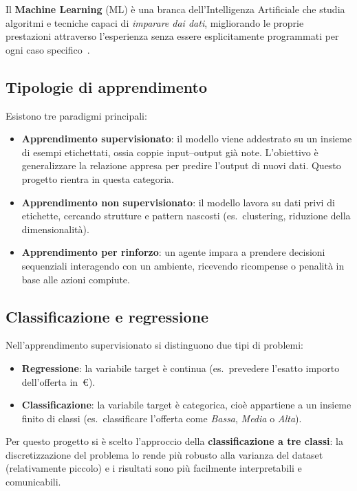 \documentclass[12pt, a4paper]{article}
\begin{document}
Il \textbf{Machine Learning} (ML) è una branca dell'Intelligenza Artificiale
che studia algoritmi e tecniche capaci di \emph{imparare dai dati}, migliorando
le proprie prestazioni attraverso l'esperienza senza essere esplicitamente
programmati per ogni caso specifico~\cite{mitchell1997}.

\subsection{Tipologie di apprendimento}

Esistono tre paradigmi principali:

\begin{itemize}
  \item \textbf{Apprendimento supervisionato}: il modello viene addestrato su un
        insieme di esempi etichettati, ossia coppie input--output già note.
        L'obiettivo è generalizzare la relazione appresa per predire l'output
        di nuovi dati. Questo progetto rientra in questa categoria.
  \item \textbf{Apprendimento non supervisionato}: il modello lavora su dati
        privi di etichette, cercando strutture e pattern nascosti
        (es.\ clustering, riduzione della dimensionalità).
  \item \textbf{Apprendimento per rinforzo}: un agente impara a prendere
        decisioni sequenziali interagendo con un ambiente, ricevendo ricompense
        o penalità in base alle azioni compiute.
\end{itemize}

\subsection{Classificazione e regressione}

Nell'apprendimento supervisionato si distinguono due tipi di problemi:

\begin{itemize}
  \item \textbf{Regressione}: la variabile target è continua
        (es.\ prevedere l'esatto importo dell'offerta in~€).
  \item \textbf{Classificazione}: la variabile target è categorica, cioè
        appartiene a un insieme finito di classi
        (es.\ classificare l'offerta come \textit{Bassa}, \textit{Media} o
        \textit{Alta}).
\end{itemize}

Per questo progetto si è scelto l'approccio della \textbf{classificazione a tre
classi}: la discretizzazione del problema lo rende più robusto alla varianza del
dataset (relativamente piccolo) e i risultati sono più facilmente interpretabili
e comunicabili.
\end{document}
